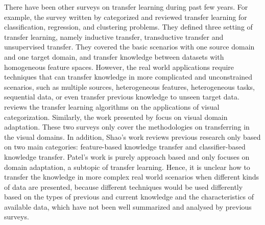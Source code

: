 \documentclass[prodmode]{acmsmall}  %
\begin{document}
There have been other surveys on transfer learning during past few years. For example, the survey written by  categorized and reviewed transfer learning for classification, regression, and clustering problems. They defined three setting of transfer learning, namely inductive transfer, transductive transfer and unsupervised transfer. They covered the basic scenarios with one source domain and one target domain, and transfer knowledge between datasets with homogeneous feature spaces. However, the real world applications require techniques that can transfer knowledge in more complicated and unconstrained scenarios, such as multiple sources, heterogeneous features, heterogeneous tasks, sequential data, or even transfer previous knowledge to unseen target data.
 reviews the transfer learning algorithms on the applications of visual categorization. Similarly, the work presented by  focus on visual domain adaptation. These two surveys only cover the methodologies on transferring in the visual domains. In addition, Shao's work reviews previous research only based on two main categories: feature-based knowledge transfer and classifier-based knowledge transfer. Patel's work is purely approach based and only focuses on domain adaptation, a subtopic of transfer learning. Hence, it is unclear how to transfer the knowledge in more complex real world scenarios when different kinds of data are presented, because different techniques would be used differently based on the types of previous and current knowledge and the characteristics of available data, which have not been well summarized and analysed by previous surveys. 
\end{document}
